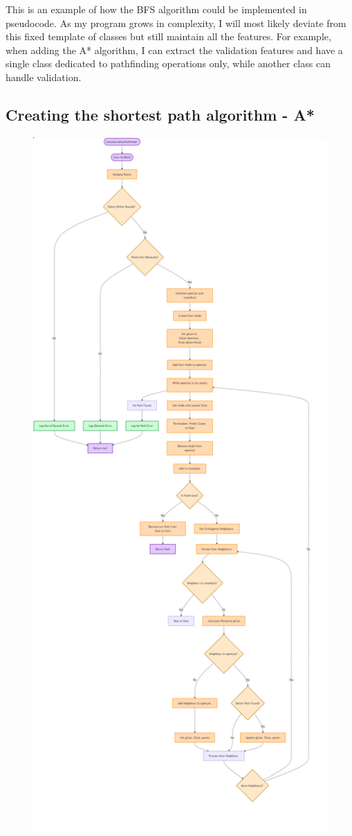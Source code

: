 \textbf{}\newline This is an example of how the BFS algorithm could be implemented in pseudocode. As my program grows in complexity, I will most likely deviate from this fixed template of classes but still maintain all the features. For example, when adding the A* algorithm, I can extract the validation features and have a single class dedicated to pathfinding operations only, while another class can handle validation.

\newpage

\subsection{Creating the shortest path algorithm - A*}

\begin{figure}[!htbp]
	\centering
	\includegraphics[width=0.55\linewidth]{Flowcharts/basicastar.png}
\end{figure}

\newpage

